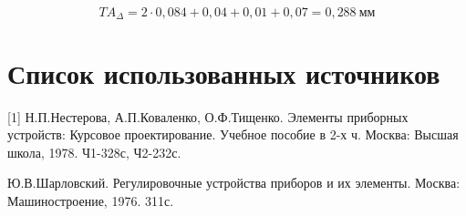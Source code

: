\documentclass[14pt,a4paper,russian]{scrartcl}
\begin{document}
        \[ T A_\Delta = 2\cdot 0,084 + 0,04 + 0,01 + 0,07 = 0,288\ \text{мм} \]
        
        
        
        

        
        
        
        
        
        
        
        

        
        
\newpage
\section*{Список использованных источников}
% 
        
[1] Н.П.Нестерова, А.П.Коваленко, О.Ф.Тищенко. 
    Элементы приборных устройств: Курсовое проектирование. Учебное пособие в 2-х ч.
    Москва: Высшая школа, 1978. Ч1-328с, Ч2-232с. \par
[2] Ю.В.Шарловский. Регулировочные устройства приборов и их элементы. 
    Москва: Машиностроение, 1976. 311с.
\end{document}
